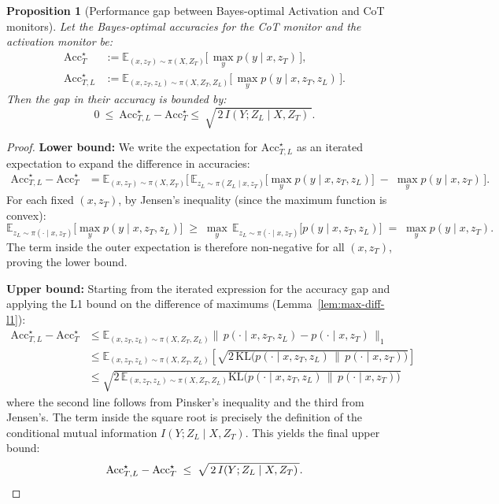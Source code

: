 \documentclass{article}
\theoremstyle{plain}
\newtheorem{proposition}[theorem]{Proposition}
\def\E{\mathbb{E}}
\begin{document}
\begin{proposition}[Performance gap between Bayes-optimal Activation and CoT monitors]
\label{prop:bayes-gap-activation-vs-cot}
Let the Bayes-optimal accuracies for the CoT monitor and the activation monitor be:
\begin{align*}
\mathrm{Acc}^{\star}_{T}
&:= \E_{(x,z_T)\sim \pi(X,Z_T)}\!\Big[\,\max_{y} p(y\mid x,z_T)\,\Big], \\
\mathrm{Acc}^{\star}_{T,L}
&:= \E_{(x,z_T,z_L)\sim \pi(X,Z_T,Z_L)}\!\Big[\,\max_{y} p(y \mid x,z_T,z_L)\,\Big].
\end{align*}
Then the gap in their accuracy is bounded by:
\begin{equation}
\label{eq:bayes-gap-statement-acc-activation}
0\ \le\ 
\mathrm{Acc}^{\star}_{T,L} - \mathrm{Acc}^{\star}_{T}
 \le\ 
 \sqrt{\,2\,I(Y;Z_L\mid X,Z_T)\,}.
\end{equation}
\end{proposition}

\begin{proof}
\textbf{Lower bound:}
We write the expectation for $\mathrm{Acc}^{\star}_{T,L}$ as an iterated expectation to expand the difference in accuracies:
\begin{align*}
\mathrm{Acc}^{\star}_{T,L}-\mathrm{Acc}^{\star}_{T} 
&= \E_{(x,z_T)\sim \pi(X,Z_T)}\Big[\,
      \E_{z_L\sim \pi(Z_L\mid x,z_T)} \big[\max_{y} p(y\mid x,z_T,z_L)\big]
      \;-\; \max_{y} p(y\mid x,z_T)\,\Big].
\end{align*}
For each fixed $(x,z_T)$, by Jensen's inequality (since the maximum function is convex):
\[
\E_{z_L\sim \pi(\cdot\mid x,z_T)} \big[\max_{y} p(y\mid x,z_T,z_L)\big]
\;\ge\; \max_{y}\,\E_{z_L\sim \pi(\cdot\mid x,z_T)} \big[p(y\mid x,z_T,z_L)\big]
\;=\; \max_{y} p(y\mid x,z_T).
\]
The term inside the outer expectation is therefore non-negative for all $(x,z_T)$, proving the lower bound.

\textbf{Upper bound:} 
Starting from the iterated expression for the accuracy gap and applying the L1 bound on the difference of maximums (Lemma~\ref{lem:max-diff-l1}):
\begin{align*}
\mathrm{Acc}^{\star}_{T,L}-\mathrm{Acc}^{\star}_{T}
&\le \E_{(x,z_T,z_L)\sim \pi(X,Z_T,Z_L)}
      \big\|\,p(\cdot\mid x,z_T,z_L)-p(\cdot\mid x,z_T)\,\big\|_1 \\
&\le \E_{(x,z_T,z_L)\sim \pi(X,Z_T,Z_L)}
      \left[ \sqrt{2\,\mathrm{KL}\!\big(p(\cdot\mid x,z_T,z_L)\,\|\,p(\cdot\mid x,z_T)\big)} \right] \\
&\le \sqrt{2\, \E_{(x,z_T,z_L)\sim \pi(X,Z_T,Z_L)} \mathrm{KL}\!\big(p(\cdot\mid x,z_T,z_L)\,\|\,p(\cdot\mid x,z_T)\big)}
\end{align*}
where the second line follows from Pinsker's inequality and the third from Jensen's. The term inside the square root is precisely the definition of the conditional mutual information $I(Y;Z_L\mid X,Z_T)$. This yields the final upper bound:
\[
\mathrm{Acc}^{\star}_{T,L}-\mathrm{Acc}^{\star}_{T}
\;\le\; \sqrt{\,2\,I(Y;Z_L\mid X,Z_T)\,}. \qedhere
\]
\end{proof}
\end{document}
